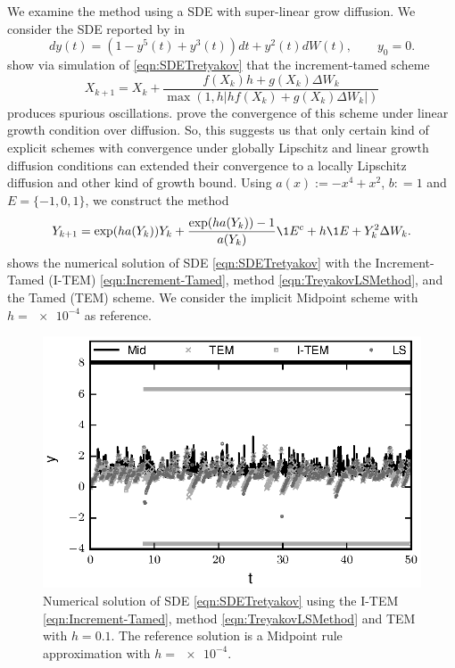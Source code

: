 \begin{example} We examine the \SM method using a SDE with super-linear grow diffusion. We 
	consider the SDE reported by \citeauthor*{Tretyakov2013} in \cite[Eq. (5.6)]{Tretyakov2013}
	\begin{equation}\label{eqn:SDETretyakov}
		dy(t) =
		\left(
			1-y^5(t) +y^3(t)  
		\right) dt
		+
		y^2(t) dW(t), \qquad y_0=0.
	\end{equation}
	\citeauthor{Tretyakov2013} show via simulation of \eqref{eqn:SDETretyakov} that the increment-tamed scheme
	\cite[Eq(1.5)]{Hutzenthaler2015}
	\begin{equation}\label{eqn:Increment-Tamed}
		X_{k+1} = X_k + 
		\frac{
			f(X_k) h + 
			g(X_k)\Delta W_k 
		}{
		\max\left(
		1, h
		\left|
		h f(X_k) +
		g(X_k)\Delta W_k
		\right|
	\right)}
	\end{equation}
	produces spurious oscillations. \citeauthor{Hutzenthaler2015} prove the convergence of this scheme under
	linear growth condition over diffusion. So, this suggests us that only certain kind of 
	explicit schemes with convergence under globally Lipschitz and linear growth diffusion conditions	
	can extended their convergence to a locally Lipschitz diffusion and other kind of growth bound.
	Using $a(x):= -x^4 +x^2$, $b: = 1$ and $E=\{-1,0,1\}$, we construct the \SM method
	\begin{equation}\label{eqn:TreyakovLSMethod}
		Y_{k+1} = \exp(ha(Y_k))Y_k + 
		\frac{\exp(ha(Y_k)) - 1}{a(Y_k)} \1{E^c}
		+h\1{E}
		+Y_k^2\Delta W_k. 		
	\end{equation}
	 shows the numerical solution of SDE \eqref{eqn:SDETretyakov} with the Increment-Tamed (I-TEM) 
	\eqref{eqn:Increment-Tamed}, \SM method \eqref{eqn:TreyakovLSMethod}, and the Tamed (TEM) scheme. 
	We consider the implicit Midpoint scheme \cite[Eq.(5.3)]{Tretyakov2013} with $h=\num{e-4}$ 	as reference.
	\begin{figure}[h!]
		\centering
		\includegraphics{./papers/paperB/figures/Tretyakov}
		\caption{
			Numerical solution of SDE \eqref{eqn:SDETretyakov} using the I-TEM 
			\eqref{eqn:Increment-Tamed}, \SM method \eqref{eqn:TreyakovLSMethod}  and TEM
			with $h=\num{0.1}$. The reference solution is a Midpoint rule approximation with $h=\num{e-4}$.
		}
		\label{fig:Tretyakov}
	\end{figure}
\end{example}

